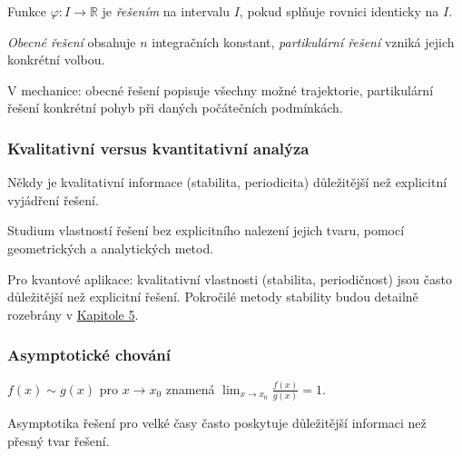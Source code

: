\begin{definition}
Funkce $\varphi: I \to \mathbb{R}$ je \emph{řešením} na intervalu $I$, pokud splňuje rovnici identicky na $I$.
\end{definition}

\begin{definition}
\emph{Obecné řešení} obsahuje $n$ integračních konstant, \emph{partikulární řešení} vzniká jejich konkrétní volbou.
\end{definition}

\begin{example}
V mechanice: obecné řešení popisuje všechny možné trajektorie, partikulární řešení konkrétní pohyb při daných počátečních podmínkách.
\end{example}

\subsubsection{Kvalitativní versus kvantitativní analýza}

\begin{intuition}
Někdy je kvalitativní informace (stabilita, periodicita) důležitější než explicitní vyjádření řešení.
\end{intuition}

\begin{definition}
Studium vlastností řešení bez explicitního nalezení jejich tvaru, pomocí geometrických a analytických metod.
\end{definition}

\begin{keyinsight}
Pro kvantové aplikace: kvalitativní vlastnosti (stabilita, periodičnost) jsou často důležitější než explicitní řešení. Pokročilé metody stability budou detailně rozebrány v \hyperref[sec:stability]{Kapitole 5}.
\end{keyinsight}

\subsubsection{Asymptotické chování}

\begin{definition}
$f(x) \sim g(x)$ pro $x \to x_0$ znamená $\lim_{x \to x_0} \frac{f(x)}{g(x)} = 1$.
\end{definition}

\begin{intuition}
Asymptotika řešení pro velké časy často poskytuje důležitější informaci než přesný tvar řešení.
\end{intuition}

